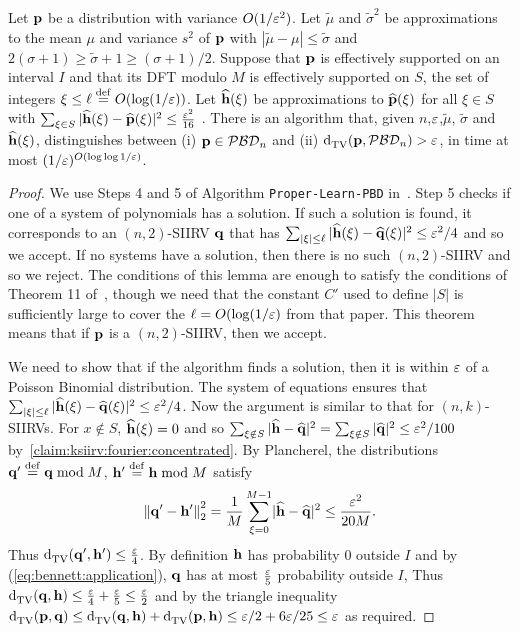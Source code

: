 \begin{lemma}
    Let $\p$ be a distribution with variance $O(1/\eps^2)$. Let $\widetilde \mu$ and $\widetilde{\sigma}^2$ be approximations to the mean $\mu$ and variance $s^2$ of $\p$ with $|\widetilde{\mu}-\mu| \leq \widetilde{\sigma}$ and $2(\sigma+1) \geq \widetilde{\sigma}+1 \geq (\sigma+1)/2$. 
Suppose that $\p$ is effectively supported on an interval $I$ and that its DFT modulo $M$ is effectively supported on $S$, the set of integers  $\xi \leq \ell\eqdef O(\log(1/\eps))$.
Let  $\fourier{\h}(\xi)$ be approximations to $\fourier{\p}(\xi)$ for all $\xi \in S$ with $\sum_{\xi \in S} |\fourier{\h}(\xi) - \fourier{\p}(\xi)|^2 \leq \frac{\eps^2}{16}$ .
 There is an algorithm that, given $n$,$\eps$,$\widetilde{\mu}$, $\widetilde{\sigma}$ and $\fourier{\h}(\xi)$, distinguishes between (i) $\p\in\classpbd[n]$ and (ii) $ \totalvardist{\p}{\classpbd[n]}>\eps$, in time at most $(1/\eps)^{O(\log \log 1/\eps)}$.
 \end{lemma}
 \begin{proof}
We use Steps 4 and 5 of Algorithm \texttt{Proper-Learn-PBD} in~\cite{DKS:15b}. Step 5 checks if one of a system of polynomials has a solution. If such a solution is found, it corresponds to an $(n,2)$-SIIRV $\q$ that has $\sum_{|\xi| \leq \ell} |\fourier{\h}(\xi) - \fourier{\q}(\xi)|^2 \leq \eps^2/4$ and so we accept. If no systems have a solution, then there is no such $(n,2)$-SIIRV and so we reject. The conditions of this lemma are enough to satisfy the conditions of Theorem 11 of~\cite{DKS:15b}, though we need that the constant $C'$ used to define $|S|$ is sufficiently large to cover the $\ell=O(\log(1/\eps)$ from that paper. This theorem means that if $\p$ is a $(n,2)$-SIIRV, then we accept.

We need to show that if the algorithm finds a solution, then it is within $\eps$ of a Poisson Binomial distribution.  The system of equations ensures that $\sum_{|\xi| \leq \ell} |\fourier{\h}(\xi) - \fourier{\q}(\xi)|^2 \leq \eps^2/4$. Now the argument is similar to that for $(n,k)$-SIIRVs.
For $x \notin S$, $\fourier{\h}(\xi)=0$ and so $\sum_{\xi \notin S} |\fourier{\h}-\fourier{\q}|^2 = \sum_{\xi \notin S} |\fourier{\q}|^2 \leq \eps^2/100$ by~\cref{claim:ksiirv:fourier:concentrated}. By Plancherel, the distributions $\q'\eqdef \q \bmod M$, $\h'\eqdef \h \bmod M$ satisfy 
\[
  \normtwo{ \q'-\h'}^2 = \frac{1}{M}\sum_{\xi=0}^{M-1} \dabs{ \fourier{\h}-\fourier{\q} }^2 \leq \frac{\eps^2}{20M}.
\] Thus $\totalvardist{\q'}{\h'} \leq \frac{\eps}{4}$. By definition $\h$ has probability $0$ outside $I$ and by (\ref{eq:bennett:application}), $\q$ has at most $\frac{\eps}{5}$ probability outside $I$, Thus $\totalvardist{\q}{\h} \leq \frac{\eps}{4}+\frac{\eps}{5} \leq \frac{\eps}{2}$ and by the triangle inequality $ \totalvardist{\p}{\q} \leq \totalvardist{\q}{\h} +  \totalvardist{\p}{\h} \leq \eps/2 + 6\eps/25 \leq \eps$ as required.
 \end{proof}
 
